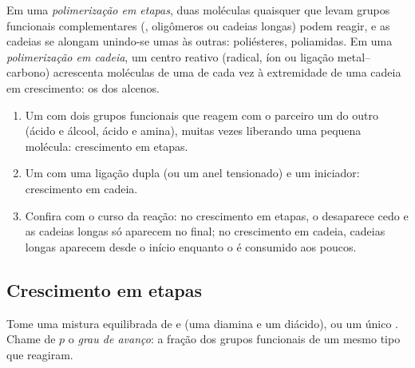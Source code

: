 \begin{definition}\label{def:b2:polymer-synthesis:step-chain}
Em uma \emph{polimerização em etapas}, duas moléculas quaisquer que levam
grupos funcionais complementares (, oligômeros ou cadeias longas) podem reagir, e as cadeias
se alongam unindo-se umas às outras: poliésteres, poliamidas. Em uma \emph{polimerização em
cadeia}, um centro reativo (radical, íon ou ligação metal--carbono)
acrescenta moléculas de  uma de cada vez à extremidade de uma cadeia em crescimento: os
 dos alcenos.
\end{definition}

\begin{method}\label{met:b2:polymer-synthesis:classify}
\begin{enumerate}
  \item Um  com dois grupos funcionais que reagem com o parceiro um do outro (ácido e álcool,
        ácido e amina), muitas vezes liberando uma pequena molécula: crescimento em etapas.
  \item Um  com uma ligação dupla  (ou um anel tensionado) e um iniciador: crescimento
        em cadeia.
  \item Confira com o curso da reação: no crescimento em etapas, o  desaparece cedo e as
        cadeias longas só aparecem no final; no crescimento em cadeia, cadeias longas aparecem desde o
        início enquanto o  é consumido aos poucos.
\end{enumerate}
\end{method}

\subsection*{Crescimento em etapas}

Tome uma mistura equilibrada de   e  (uma diamina e um diácido), ou um único
 . Chame de $p$ o \emph{grau de avanço}: a fração dos grupos funcionais de um mesmo
tipo que reagiram.

